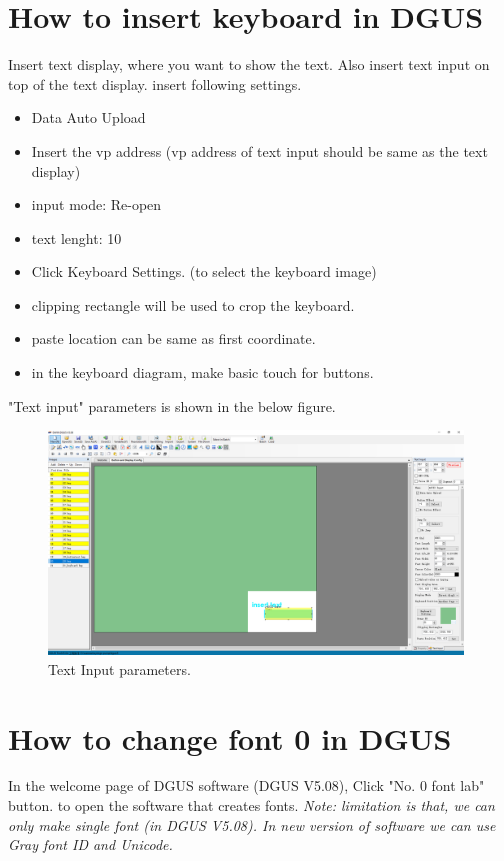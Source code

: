 \documentclass[12pt, A4]{article} %
\begin{document}
\section{How to insert keyboard in DGUS}
Insert text display, where you want to show the text. Also insert text input on top of the text display. insert following settings.

\begin{itemize}
\item Data Auto Upload
\item Insert the vp address (vp address of text input should be same as the text display)
\item input mode: Re-open
\item text lenght: 10
\item Click Keyboard Settings. (to select the keyboard image)
\item clipping rectangle will be used to crop the keyboard.
\item paste location can be same as first coordinate.
\item in the keyboard diagram, make basic touch for buttons.
\end{itemize}

"Text input" parameters is shown in the below figure.

\begin{figure}[!htb] %
	\centering
	\includegraphics[width=11cm]{textInput} 
	\caption{Text Input parameters.\\}
\end{figure}

\newpage


\section{How to change font 0 in DGUS}
In the welcome page of DGUS software (DGUS V5.08), Click "No. 0 font lab" button. to open the software that creates fonts.
\emph{Note: limitation is that, we can only make single font (in DGUS V5.08). In new version of software we can use Gray font ID and Unicode.}
\end{document}
